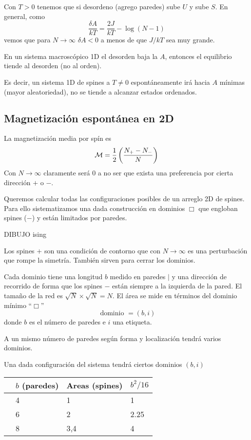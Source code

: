 \documentclass[10pt,oneside]{CBFT_book}
\begin{document}
Con $T > 0$ tenemos que si desordeno (agrego paredes) sube $U$ y sube $S$.
En general, como 
\[
	\frac{\delta A}{kT} = \frac{2J}{kT} - \log(N-1)
\]
vemos que para $N\to\infty$ $\delta A < 0$ a menos de que $J/kT$ sea muy grande.


En un sistema macroscópico 1D el desorden baja la $A$, entonces el equilibrio tiende
al desorden (no al orden).

Es decir, un sistema 1D de spines a $ T \neq 0 $ espontáneamente irá hacia $ A $
mínimas (mayor aleatoriedad), no se tiende a alcanzar estados ordenados.

\subsection{Magnetización espontánea en 2D}

La magnetización media por spín es
\[
	\mathcal{M} = \frac{1}{2} \left( \frac{ N_+ - N_- }{ N } \right)
\]
Con $N\to\infty$ claramente será 0 a no ser que exista una preferencia por cierta dirección $+$ o $-$.

Queremos calcular todas las configuraciones posibles de un arreglo 2D de spines.
Para ello sistematizamos una dada construcción en dominios $\Box$ que engloban spines ($-$) y están
limitados por paredes.

DIBUJO ising


Los spines $+$ son una condición de contorno que con $N\to\infty$ es una perturbación que rompe la
simetría. También sirven para cerrar los dominios.

Cada dominio tiene una longitud $b$ medido en paredes $|$ y una dirección de recorrido de forma que 
los spines $-$ están siempre a la izquierda de la pared.
El tamaño de la red es $\sqrt{N} \times \sqrt{N} = N$. El área se mide en términos del dominio 
mínimo ``$\Box$''
\[
	\text{ dominio } = (b,i)
\]
donde $b$ es el número de paredes e $i$ una etiqueta.

A un mismo número de paredes según forma y localización tendrá varios dominios.

Una dada configuración del sistema tendrá ciertos dominios $(b,i)$

\begin{center}
\begin{tabular}{llll}
 & $b$ (paredes) & Areas (spines) & $b^2/16$ \\
\hline
 & 4 & 1 & 1\\
 & 6 & 2 & 2.25\\
 & 8 & 3,4 & 4
\end{tabular}
\end{center}
\end{document}

